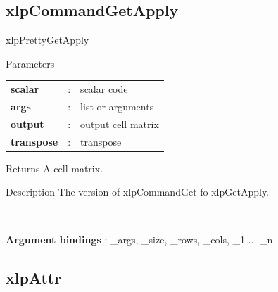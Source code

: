 \subsection{xlpCommandGetApply}

\begin{xlpfunctitle}{xlpPrettyGetApply}

\begin{xlpfunc}{Parameters}
\begin{tabular}{p{3.5cm}cl}
\textbf{scalar}& : & scalar code \\
\textbf{args}& : & list or arguments \\
\textbf{output}& : & output cell matrix\\
\textbf{transpose}& : & transpose
\end{tabular}

\vspace{2mm}

\end{xlpfunc}


\begin{xlpfunc}{Returns}
A cell matrix.
\end{xlpfunc}

\begin{xlpfunc}{Description}
The version of xlpCommandGet fo xlpGetApply.

\

\textbf{Argument bindings} : \_args, \_size, \_rows, \_cols, \_1 ... \_n

\end{xlpfunc}
\end{xlpfunctitle}












\subsection{xlpAttr}

